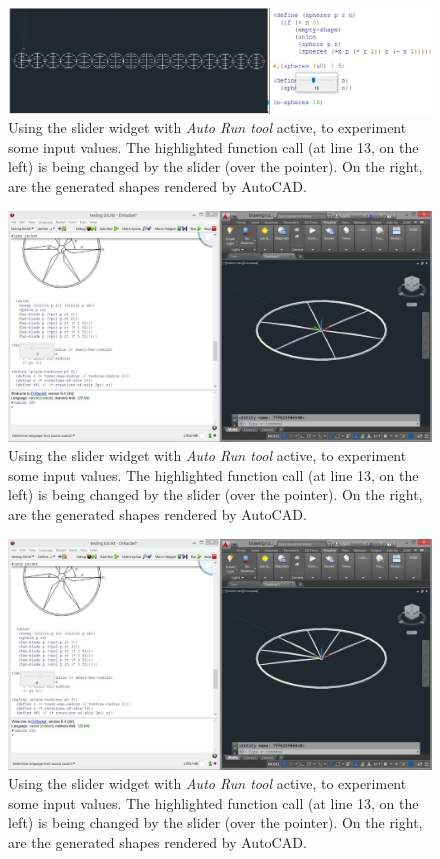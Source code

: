 \begin{figure}[!h]
  \centering
  \includegraphics[width=1\textwidth]{images/sliders3}
    \caption{Using the slider widget with \textit{Auto Run tool} active, to experiment some input values. The highlighted function call (at line 13, on the left) is being changed by the slider (over the pointer). On the right, are the generated shapes rendered by AutoCAD.}
  \label{fig:s3}
\end{figure}

\begin{figure}[!h]
  \centering
  \includegraphics[width=1\textwidth]{images/slider-turbine-1}
    \caption{Using the slider widget with \textit{Auto Run tool} active, to experiment some input values. The highlighted function call (at line 13, on the left) is being changed by the slider (over the pointer). On the right, are the generated shapes rendered by AutoCAD.}
  \label{fig:sturbine1}
\end{figure}

\begin{figure}[!h]
  \centering
  \includegraphics[width=1\textwidth]{images/slider-turbine-2}
    \caption{Using the slider widget with \textit{Auto Run tool} active, to experiment some input values. The highlighted function call (at line 13, on the left) is being changed by the slider (over the pointer). On the right, are the generated shapes rendered by AutoCAD.}
  \label{fig:sturbine2}
\end{figure}

